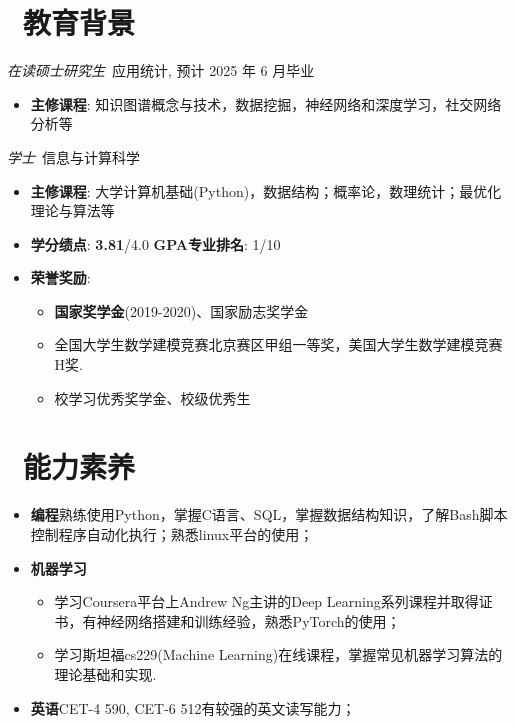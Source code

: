 \documentclass{resume}
\begin{document}



\section{\faGraduationCap\  教育背景}
\textit{在读硕士研究生}\ 应用统计, 预计 2025 年 6 月毕业
\begin{itemize}
	\item \textbf{主修课程}: 知识图谱概念与技术，数据挖掘，神经网络和深度学习，社交网络分析等
\end{itemize}

\textit{学士}\ 信息与计算科学
\begin{itemize}
	\item \textbf{主修课程}: 大学计算机基础(Python)，数据结构；概率论，数理统计；最优化理论与算法等
	\item \textbf{学分绩点}: \textbf{3.81}/4.0 \quad \textbf{GPA专业排名}: 1/10
	\item \textbf{荣誉奖励}:
	      \begin{itemize}[label=$\ast$]
		      \item \textbf{国家奖学金}(2019-2020)、国家励志奖学金
		      \item 全国大学生数学建模竞赛北京赛区甲组一等奖，美国大学生数学建模竞赛H奖.
		      \item 校学习优秀奖学金、校级优秀生
	      \end{itemize}
\end{itemize}

\section{\faCogs\ 能力素养}
\begin{itemize}[parsep=0.5ex]
	\item \textbf{编程}\quad 熟练使用Python，掌握C语言、SQL，掌握数据结构知识，了解Bash脚本控制程序自动化执行；熟悉linux平台的使用；
	\item \textbf{机器学习}
	      \begin{itemize}[parsep=0.5ex,label=$\ast$]
		      \item 学习Coursera平台上Andrew Ng主讲的Deep Learning系列课程并取得证书，有神经网络搭建和训练经验，熟悉PyTorch的使用；
		      \item 学习斯坦福cs229(Machine Learning)在线课程，掌握常见机器学习算法的理论基础和实现.
	      \end{itemize}

	\item \textbf{英语}\quad CET-4 590, CET-6 512\quad 有较强的英文读写能力；

\end{itemize}
\end{document}
